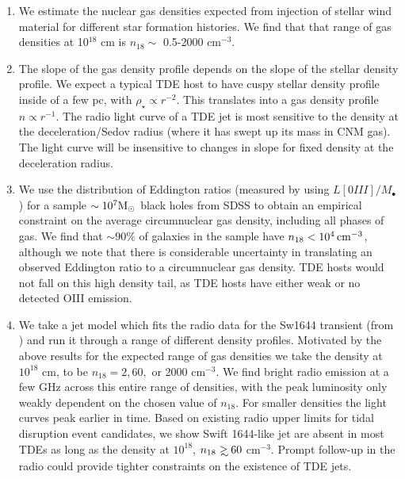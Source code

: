 \documentclass[usenatbib,fleqn]{mnras}
\newcommand\gsim{\mathrel{\rlap{\lower4pt\hbox{\hskip1pt$\sim$}}
    \raise1pt\hbox{$>$}}}
\newcommand{\Mbh}[1][]{M_{\bullet#1}}
\newcommand{\Msun}{{\rm M_\odot}}
\begin{document}
\begin{enumerate}
\item We estimate the nuclear gas densities expected from injection of
  stellar wind material for different star formation histories. We
  find that that range of gas densities at 10$^{18}$ cm is $n_{18}
  \sim$ 0.5-2000 cm$^{-3}$.

\item The slope of the gas density profile depends on the slope of the
  stellar density profile. We expect a typical TDE host to have cuspy
  stellar density profile inside of a few pc, with $\rho_\star
  \propto r^{-2}$. This translates into a gas density profile $n
  \propto r^{-1}$. The radio light curve of a TDE jet is most
  sensitive to the density at the deceleration/Sedov radius (where it
  has swept up its mass in CNM gas). The light curve will be
  insensitive to changes in slope for fixed density at the
  deceleration radius.

\item We use the distribution of Eddington ratios (measured by
  \citealt{Kauffmann&Heckman2009} using $L[0III]/\Mbh$) for a sample
  $\sim 10^{7} \Msun$ black holes from SDSS to obtain an empirical
  constraint on the average circumnuclear gas density, including all
  phases of gas. We find that $\sim90\%$ of galaxies in the sample
  have $n_{18}<10^{4} \, {\rm cm}^{-3}$, although we note that there is
  considerable uncertainty in translating an observed Eddington ratio
  to a circumnuclear gas density. TDE hosts would not fall on this
  high density tail, as TDE hosts have either weak or no detected OIII
  emission.

\item We take a jet model which fits the radio data for the Sw1644
  transient (from \citealt{Mimica+2015}) and run it through a range of
  different density profiles. Motivated by the above results for the
  expected range of gas densities we take the density at $10^{18}$ cm,
  to be $n_{18}=2, 60,$ or 2000 cm$^{-3}$. We find bright radio
  emission at a few GHz across this entire range of densities, with
  the peak luminosity only weakly dependent on the chosen value of
  $n_{18}$.  For smaller densities the light curves peak earlier in
  time. Based on existing radio upper limits for tidal disruption
  event candidates, we show Swift 1644-like jet are absent in most TDEs
  as long as the density at $10^{18}$, $n_{18} \gsim  60$
  cm$^{-3}$. Prompt follow-up in the radio could provide tighter
  constraints on the existence of TDE jets.  
\end{enumerate}
\end{document}
